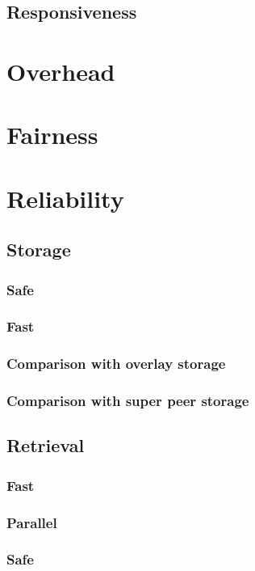         \subsection{Responsiveness}

    \section{Overhead}
    \section{Fairness}
    \section{Reliability}
            \subsection{Storage}
        \label{reliability_compare_storage}
            \subsubsection{Safe}
            \subsubsection{Fast}
            \subsubsection{Comparison with overlay storage}
            \subsubsection{Comparison with super peer storage}
            \subsection{Retrieval}
        \label{reliability_compare_retrieval}
            \subsubsection{Fast}
            \subsubsection{Parallel}
            \subsubsection{Safe}
